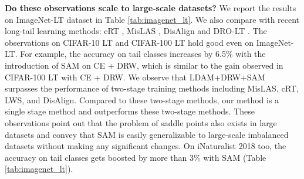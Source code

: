 \documentclass{article}
\begin{document}
\textbf{Do these observations scale to large-scale datasets?}
We report the results on ImageNet-LT dataset in Table \ref{tab:imagenet_lt}. We also compare with recent long-tail learning methods:  cRT \cite{Kang2020Decoupling}, MisLAS \cite{zhong2021improving}, DisAlign \cite{zhang2021distribution} and DRO-LT \cite{Samuel_2021_ICCV}. The observations on CIFAR-10 LT and CIFAR-100 LT hold good even on ImageNet-LT. For example, the accuracy on tail classes increases by 6.5\% with the introduction of SAM on CE + DRW, which is similar to the gain observed in CIFAR-100 LT with CE + DRW. We observe that LDAM+DRW+SAM surpasses the performance of two-stage training methods including MisLAS, cRT, LWS, and DisAlign. Compared to these two-stage methods, our method is a single stage method and outperforms these two-stage methods. These observations point out that the problem of saddle points also exists in large datasets and convey that SAM is easily generalizable to large-scale imbalanced datasets without making any significant changes. On iNaturalist 2018 \cite{van2018inaturalist} too, the accuracy on tail classes gets boosted by more than 3\% with SAM (Table \ref{tab:imagenet_lt}). 
\end{document}
